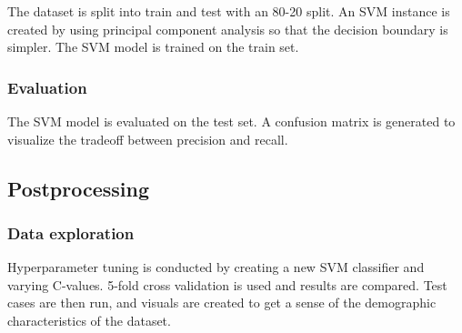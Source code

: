 \documentclass[10pt,twocolumn]{article}
\begin{document}
The dataset is split into train and test with an 80-20 split. An SVM instance is created by using principal component analysis so that the decision boundary is simpler. The SVM model is trained on the train set.

\subsubsection{Evaluation}

The SVM model is evaluated on the test set. A confusion matrix is generated to visualize the tradeoff between precision and recall.

\subsection{Postprocessing}

\subsubsection{Data exploration}
Hyperparameter tuning is conducted by creating a new SVM classifier and varying C-values. 5-fold cross validation is used and results are compared. Test cases are then run, and visuals are created to get a sense of the demographic characteristics of the dataset.


\printbibliography
\end{document}
